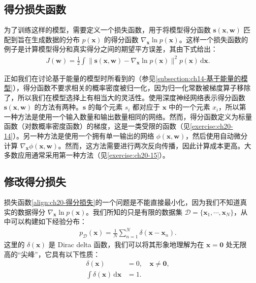 \documentclass[../../main.tex]{subfiles}
\begin{document}
\subsection{得分损失函数}\label{subsection:ch20-得分损失}

为了训练这样的模型，需要定义一个损失函数，用于将模型得分函数 $\bm{s}(\bm{x},\bm{w})$ 匹配到旨在生成数据的分布 $p(\bm{x})$ 的得分函数 $\nabla_{\bm{x}}\ln p(\bm{x})$。这样一个损失函数的例子是计算模型得分和真实得分之间的期望平方误差，其由下式给出：
\begin{align}
J(\bm{w})=\frac{1}{2}\int\big\|\bm{s}(\bm{x},\bm{w})-\nabla_{\bm{x}}\ln p(\bm{x})\big\|^2p(\bm{x})\,\mathrm{d}\bm{x}.
\label{align:ch20-得分损失}
\end{align}

正如我们在讨论基于能量的模型时所看到的（参见\cref{subsection:ch14-基于能量的模型}），得分函数不要求相关的概率密度被归一化，因为归一化常数被梯度算子移除了，所以我们在模型选择上有相当大的灵活性。使用深度神经网络表示得分函数 $\bm{s}(\bm{x},\bm{w})$ 的方法有两种。$\bm{s}$ 的每个元素 $s_i$ 都对应于 $\bm{x}$ 中的一个元素 $x_i$，所以第一种方法是使用一个输入数量和输出数量相同的网络。然而，得分函数定义为标量函数（对数概率密度函数）的梯度，这是一类受限的函数（见\cref{exercise:ch20-14}）。另一种方法是使用一个拥有单一输出的网络 $\phi(\bm{x},\bm{w})$，然后使用自动微分计算 $\nabla_{\bm{x}}\phi(\bm{x},\bm{w})$。然而，这方法需要进行两次反向传播，因此计算成本更高。大多数应用通常采用第一种方法（见\cref{exercise:ch20-15}）。

\subsection{修改得分损失}\label{subsection:ch20-修改得分损失}

损失函数\eqref{align:ch20-得分损失}的一个问题是不能直接最小化，因为我们不知道真实的数据得分 $\nabla_{\bm{x}}\ln p(\bm{x})$。我们所知的只是有限的数据集 $\mathcal{D}=\{\bm{x}_1,\cdots,\bm{x}_N\}$，从中可以构建如下经验分布：
\begin{align}
p_{\mathcal{D}}(\bm{x})=\frac{1}{N}\sum_{n=1}^{N}\delta(\bm{x}-\bm{x}_n).
\label{align:ch20-经验分布}
\end{align}
这里的 $\delta(\bm{x})$ 是 Dirac delta 函数，我们可以将其形象地理解为在 $\bm{x}=\bm{0}$ 处无限高的“尖峰”，它具有以下性质：
\begin{align}
\delta(\bm{x})&=0,\quad \bm{x}\neq\bm{0},
\label{align:ch20-delta零}\\
\int\delta(\bm{x})\,\mathrm{d}\bm{x}&=1.
\label{align:ch20-delta归一}
\end{align}
\end{document}
